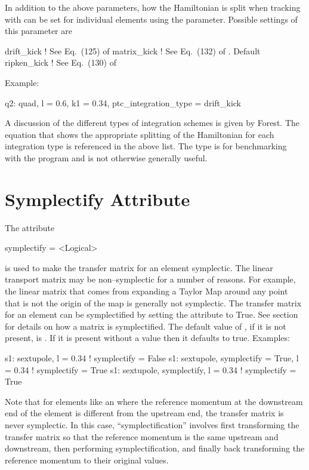 In addition to the above parameters, how the Hamiltonian is split when
tracking with  can be set for individual elements using the
 parameter. Possible settings of this
parameter are
\begin{example}
  drift_kick    ! See Eq.~(125) of \cite{b:geo.int}
  matrix_kick   ! See Eq.~(132) of \cite{b:geo.int}. Default
  ripken_kick   ! See Eq.~(130) of \cite{b:geo.int}
\end{example}
Example:
\begin{example}
  q2: quad, l = 0.6, k1 = 0.34, ptc_integration_type = drift_kick
\end{example}
A discussion of the different types of integration schemes is given by
Forest\cite{b:geo.int}. The equation that shows the appropriate
splitting of the Hamiltonian for each integration type is referenced
in the above list. The  type is for benchmarking with
the  program and is not otherwise generally useful.

\section{Symplectify Attribute}
\label{s:symp}

The  attribute
\begin{example}
  symplectify = <Logical>
\end{example}
is used to make the transfer matrix for an element symplectic. The
linear transport matrix may be non--symplectic for a number of
reasons.  For example, the linear matrix that comes from expanding a
Taylor Map around any point that is not the origin of the map is
generally not symplectic. The transfer matrix for an element can be
symplectified by setting the  attribute to True. See
section~ for details on how a matrix is
symplectified. The default value of , if it is not
present, is . If it is present without a value then it
defaults to true. Examples:
\begin{example}
  s1: sextupole, l = 0.34                       ! symplectify = False
  s1: sextupole, symplectify = True, l = 0.34   ! symplectify = True
  s1: sextupole, symplectify, l = 0.34          ! symplectify = True
\end{example}

\label{lcavity} Note that for elements like an  where the
reference momentum at the downstream end of the element is different
from the upstream end, the transfer matrix is never symplectic. In
this case, ``symplectification'' involves first transforming the
transfer matrix so that the reference momentum is the same upstream
and downstream, then performing symplectification, and finally back
transforming the reference momentum to their original values.

